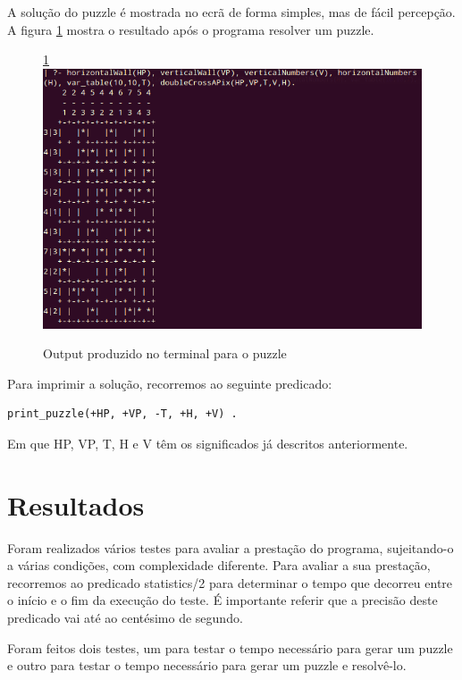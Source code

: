 \documentclass[runningheads,a4paper]{llncs}
\begin{document}
A solução do puzzle é mostrada no ecrã de forma simples, mas de fácil percepção. A figura \ref{fig:outputboard} mostra o resultado após o programa resolver um puzzle.

\begin{figure}[h]
\ref{fig:outputboard}
\centering
\includegraphics[scale=0.5]{res/output.png}
\caption{Output produzido no terminal para o puzzle}
\label{fig:outputboard}
\end{figure}

Para imprimir a solução, recorremos ao seguinte predicado:

\begin{lstlisting}
print_puzzle(+HP, +VP, -T, +H, +V) .
\end{lstlisting}

Em que HP, VP, T, H e V têm os significados já descritos anteriormente.

\section{Resultados}

Foram realizados vários testes para avaliar a prestação do programa, sujeitando-o a várias condições, com complexidade diferente. Para avaliar a sua prestação, recorremos ao predicado statistics/2 para determinar o tempo que decorreu entre o início e o fim da execução do teste. É importante referir que a precisão deste predicado vai até ao centésimo de segundo.

Foram feitos dois testes, um para testar o tempo necessário para gerar um puzzle e outro para testar o tempo necessário para gerar um puzzle e resolvê-lo. 
\end{document}
